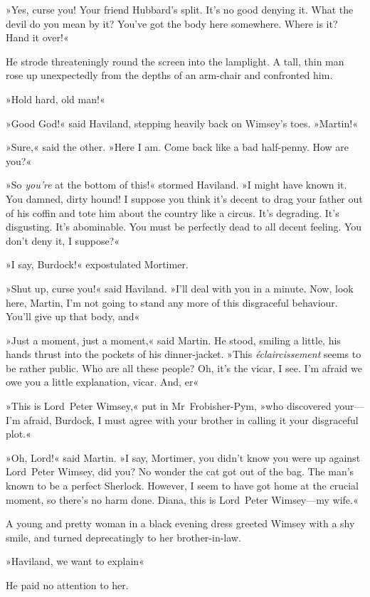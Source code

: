 »Yes, curse you! Your friend Hubbard's split. It's no good denying it. What the devil do you mean by it? You've got the body here somewhere. Where is it? Hand it over!«

He strode threateningly round the screen into the lamplight. A tall, thin man rose up unexpectedly from the depths of an arm-chair and confronted him.

»Hold hard, old man!«

»Good God!« said Haviland, stepping heavily back on Wimsey's toes. »Martin!«

»Sure,« said the other. »Here I am. Come back like a bad half-penny. How are you?«

»So \textit{you're} at the bottom of this!« stormed Haviland. »I might have known it. You damned, dirty hound! I suppose you think it's decent to drag your father out of his coffin and tote him about the country like a circus. It's degrading. It's disgusting. It's abominable. You must be perfectly dead to all decent feeling. You don't deny it, I suppose?«

»I say, Burdock!« expostulated Mortimer.

»Shut up, curse you!« said Haviland. »I'll deal with you in a minute. Now, look here, Martin, I'm not going to stand any more of this disgraceful behaviour. You'll give up that body, and\longdash«

»Just a moment, just a moment,« said Martin. He stood, smiling a little, his hands thrust into the pockets of his dinner-jacket. »This \textit{éclaircissement} seems to be rather public. Who are all these people? Oh, it's the vicar, I see. I'm afraid we owe you a little explanation, vicar. And, er\longdash«

»This is Lord~Peter Wimsey,« put in Mr~Frobisher-Pym, »who discovered your—I'm afraid, Burdock, I must agree with your brother in calling it your disgraceful plot.«

»Oh, Lord!« said Martin. »I say, Mortimer, you didn't know you were up against Lord~Peter Wimsey, did you? No wonder the cat got out of the bag. The man's known to be a perfect Sherlock. However, I seem to have got home at the crucial moment, so there's no harm done. Diana, this is Lord~Peter Wimsey—my wife.«

A young and pretty woman in a black evening dress greeted Wimsey with a shy smile, and turned deprecatingly to her brother-in-law.

»Haviland, we want to explain\longdash«

He paid no attention to her.

